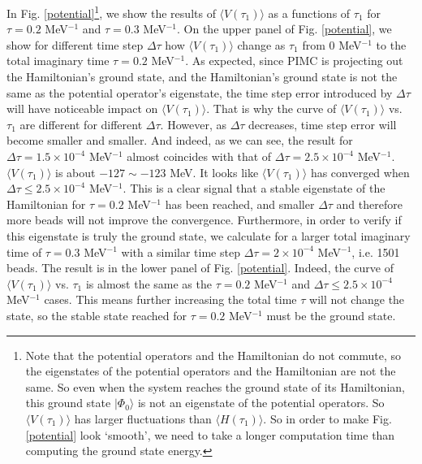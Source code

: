 \documentclass[12pt,letterpaper,UTF8]{report}
\begin{document}
In Fig. \ref{potential}\footnote{Note that the potential operators and the Hamiltonian do not commute, so the eigenstates of the potential operators and the Hamiltonian are not the same. So even when the system reaches the ground state of its Hamiltonian, this ground state $| \Phi_0 \rangle$ is not an eigenstate of the potential operators. So $\langle {V}(\tau_1) \rangle$ has larger fluctuations than $\langle H(\tau_1) \rangle$. So in order to make Fig. \ref{potential} look `smooth', we need to take a longer computation time than computing the ground state energy.},
we show the results of $\langle {V}(\tau_1) \rangle$ as a functions of $\tau_1$ for $\tau=0.2$ MeV$^{-1}$ and $\tau=0.3$ MeV$^{-1}$.
On the upper panel of Fig. \ref{potential}, we show for different time step $\Delta \tau$ how $\langle {V}(\tau_1) \rangle$ change as $\tau_1$ from 0 MeV$^{-1}$ to the total imaginary time $\tau=0.2$ MeV$^{-1}$.
As expected, since PIMC is projecting out the Hamiltonian's ground state, and the Hamiltonian's ground state is not the same as the potential operator's eigenstate, the time step error introduced by $\Delta \tau$ will have noticeable impact on $\langle {V}(\tau_1) \rangle$.
That is why the curve of $\langle {V}(\tau_1) \rangle$ vs. $\tau_1$ are different for different $\Delta \tau$.
However, as $\Delta \tau$ decreases, time step error will become smaller and smaller.
And indeed, as we can see, the result for $\Delta \tau=1.5\times 10^{-4}$ MeV$^{-1}$ almost coincides with that of $\Delta \tau=2.5\times 10^{-4}$ MeV$^{-1}$.
$\langle {V}(\tau_1) \rangle$ is about $-127\sim-123$ MeV.
It looks like $\langle {V}(\tau_1) \rangle$ has converged when $\Delta \tau \leq 2.5\times 10^{-4}$ MeV$^{-1}$.
This is a clear signal that a stable eigenstate of the Hamiltonian for $\tau=0.2$ MeV$^{-1}$ has been reached, and smaller $\Delta \tau$ and therefore more beads will not improve the convergence.
Furthermore, in order to verify if this eigenstate is truly the ground state, we calculate for a larger total imaginary time of $\tau=0.3$ MeV$^{-1}$ with a similar time step $\Delta \tau=2 \times 10^{-4}$ MeV$^{-1}$, i.e. 1501 beads.
The result is in the lower panel of Fig. \ref{potential}.
Indeed, the curve of $\langle {V}(\tau_1) \rangle$ vs. $\tau_1$ is almost the same as the $\tau=0.2$ MeV$^{-1}$ and $\Delta \tau \leq 2.5\times 10^{-4}$ MeV$^{-1}$ cases.
This means further increasing the total time $\tau$ will not change the state, so the stable state reached for $\tau=0.2$ MeV$^{-1}$ must be the ground state.
\end{document}
